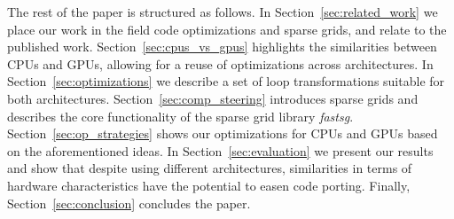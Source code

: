 The rest of the paper is structured as follows. In
Section~\ref{sec:related_work} we place our work in the field code 
optimizations and sparse grids, and relate to the published work.
Section~\ref{sec:cpus_vs_gpus} highlights the similarities between CPUs and GPUs,
allowing for a reuse of optimizations across architectures.
In Section~\ref{sec:optimizations} we describe a set of loop transformations
suitable for both architectures. Section~\ref{sec:comp_steering}
introduces sparse grids and describes the core functionality of
the sparse grid library \textit{fastsg}. Section~\ref{sec:op_strategies} shows our
optimizations for CPUs and GPUs based on the aforementioned ideas. In
Section~\ref{sec:evaluation} we present our results and show that despite using
different architectures, similarities in terms of hardware characteristics have the potential to
easen code porting. Finally, Section~\ref{sec:conclusion} concludes the
paper.
